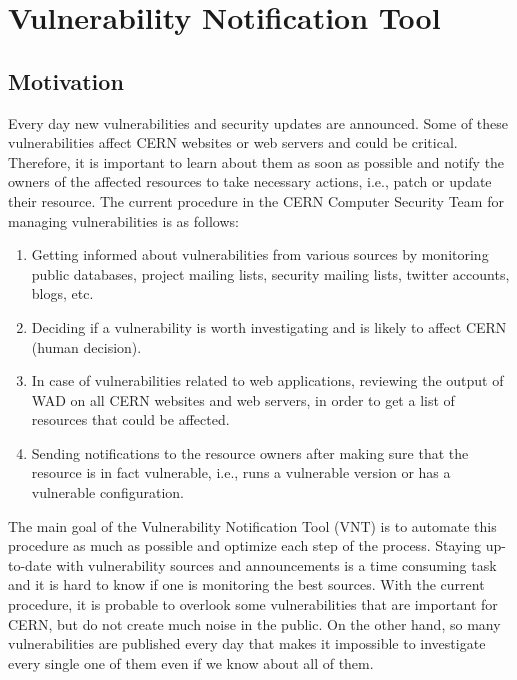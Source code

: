 \chapter{Vulnerability Notification Tool}
\label{vulnerability-notification-tool}
\thispagestyle{empty}

\section{Motivation}
Every day new vulnerabilities and security updates are announced. Some of these vulnerabilities affect CERN websites or web servers and could be critical. Therefore, it is important to learn about them as soon as possible and notify the owners of the affected resources to take necessary actions, i.e., patch or update their resource. The current procedure in the CERN Computer Security Team for managing vulnerabilities is as follows:
\begin{enumerate}
\item Getting informed about vulnerabilities from various sources by monitoring public databases, project mailing lists, security mailing lists, twitter accounts, blogs, etc.
\item Deciding if a vulnerability is worth investigating and is likely to affect CERN (human decision).
\item In case of vulnerabilities related to web applications, reviewing the output of WAD on all CERN websites and web servers, in order to get a list of resources that could be affected.
\item Sending notifications to the resource owners after making sure that the resource is in fact vulnerable, i.e., runs a vulnerable version or has a vulnerable configuration.
\end{enumerate}

The main goal of the Vulnerability Notification Tool (VNT) is to automate this procedure as much as possible and optimize each step of the process. Staying up-to-date with vulnerability sources and announcements is a time consuming task and it is hard to know if one is monitoring the best sources. With the current procedure, it is probable to overlook some vulnerabilities that are important for CERN, but do not create much noise in the public. 
On the other hand, so many vulnerabilities are published every day that makes it impossible to investigate every single one of them even if we know about all of them.

